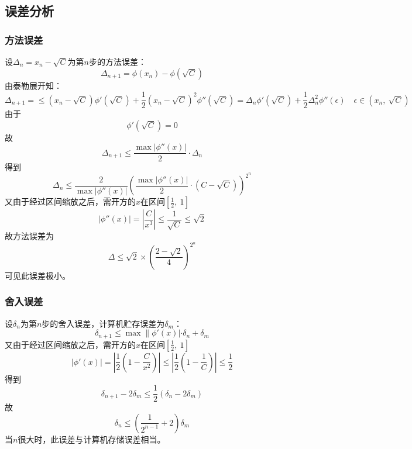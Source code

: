 \documentclass[lang=cn,11pt,a4paper]{elegantpaper}
\begin{document}
\subsection{误差分析}
\subsubsection{方法误差}
设$\Delta_n=x_n-\sqrt{C}$为第$n$步的方法误差：
\begin{equation}
  \Delta_{n+1}=\phi(x_n)-\phi(\sqrt{C})
\end{equation}
由泰勒展开知：
\begin{equation}
  \Delta_{n+1}=\leq (x_n-\sqrt{C})\phi'(\sqrt{C})+\frac{1}{2}(x_n-\sqrt{C})^2\phi''(\sqrt{C})=\Delta_n\phi'(\sqrt{C})+\frac{1}{2}\Delta_n^2\phi''(\epsilon)\quad \epsilon \in (x_n,\ \sqrt{C})
\end{equation}
由于
\begin{equation}
  \phi'(\sqrt{C})=0
\end{equation}
故
\begin{equation}
  \Delta_{n+1}\leq \frac{\max \left|\phi''(x)\right|}{2} \cdot \Delta_{n}
\end{equation}
得到
\begin{equation}
  \Delta_{n}\leq \frac{2}{\max \left|\phi''(x)\right|}\left(\frac{\max \left|\phi''(x)\right|}{2}\cdot (C-\sqrt{C})\right)^{2^n}
\end{equation}
又由于经过区间缩放之后，需开方的$x$在区间$[\frac{1}{2},\ 1]$
\begin{equation}
  \left|\phi''(x)\right| = \left|\frac{C}{x^3}\right|\leq \frac{1}{\sqrt{C}}\leq \sqrt{2}
\end{equation}
故方法误差为
\begin{equation}
  \Delta \leq \sqrt{2}\times(\frac{2-\sqrt{2}}{4})^{2^n}
\end{equation}
可见此误差极小。
\subsubsection{舍入误差}
设$\delta_n$为第$n$步的舍入误差，计算机贮存误差为$\delta_m$：
\begin{equation}
  \delta_{n+1}\leq \max\|\phi'(x)|\cdot \delta_n + \delta_m
\end{equation}
又由于经过区间缩放之后，需开方的$x$在区间$[\frac{1}{2},\ 1]$
\begin{equation}
  |\phi'(x)| = \left|\frac{1}{2}\left(1-\frac{C}{x^2}\right)\right| \leq \left|\frac{1}{2}\left(1-\frac{1}{C}\right)\right| \leq \frac{1}{2}
\end{equation}
得到
\begin{equation}
  \delta_{n+1}-2\delta_m \leq \frac{1}{2}(\delta_n - 2\delta_m)
\end{equation}
故
\begin{equation}
  \delta_{n} \leq \left(\frac{1}{2^{n-1}} + 2\right)\delta_m
\end{equation}
当$n$很大时，此误差与计算机存储误差相当。
\end{document}
